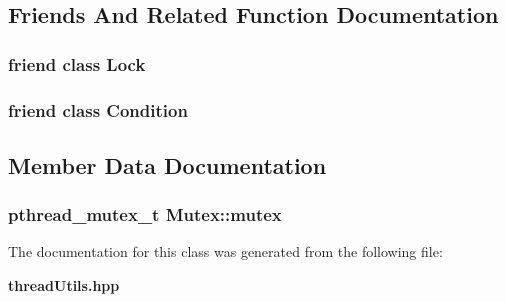 \subsection{Friends And Related Function Documentation}
\subsubsection{\setlength{\rightskip}{0pt plus 5cm}friend class {\bf Lock}\hspace{0.3cm}{\tt  [friend]}}\label{classMutex_5bf7608e05250fb524a1229bcf83ece3}


\subsubsection{\setlength{\rightskip}{0pt plus 5cm}friend class {\bf Condition}\hspace{0.3cm}{\tt  [friend]}}\label{classMutex_0705c7682858f6dcf7fe85cba92f0a5c}




\subsection{Member Data Documentation}
\subsubsection{\setlength{\rightskip}{0pt plus 5cm}pthread\_\-mutex\_\-t {\bf Mutex::mutex}\hspace{0.3cm}{\tt  [private]}}\label{classMutex_8feb0b01916c1feedd1f0c0dcd74081b}




The documentation for this class was generated from the following file:\begin{CompactItemize}
\item 
{\bf thread\-Utils.hpp}\end{CompactItemize}
